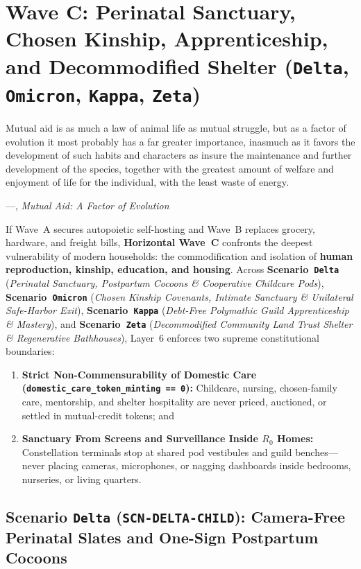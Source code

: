 \chapter{Wave C: Perinatal Sanctuary, Chosen Kinship, Apprenticeship, and Decommodified Shelter (\texttt{Delta}, \texttt{Omicron}, \texttt{Kappa}, \texttt{Zeta})}
\label{ch:wave-c}

\epigraph{Mutual aid is as much a law of animal life as mutual struggle, but as a factor of evolution it most probably has a far greater importance, inasmuch as it favors the development of such habits and characters as insure the maintenance and further development of the species, together with the greatest amount of welfare and enjoyment of life for the individual, with the least waste of energy.}{---\textcite{kropotkin1902}, \textit{Mutual Aid: A Factor of Evolution}}

If Wave~A secures autopoietic self-hosting and Wave~B replaces grocery, hardware, and freight bills, \textbf{Horizontal Wave~C} confronts the deepest vulnerability of modern households: the commodification and isolation of \textbf{human reproduction, kinship, education, and housing}. Across \textbf{Scenario~\texttt{Delta}} (\textit{Perinatal Sanctuary, Postpartum Cocoons \& Cooperative Childcare Pods}), \textbf{Scenario~\texttt{Omicron}} (\textit{Chosen Kinship Covenants, Intimate Sanctuary \& Unilateral Safe-Harbor Exit}), \textbf{Scenario~\texttt{Kappa}} (\textit{Debt-Free Polymathic Guild Apprenticeship \& Mastery}), and \textbf{Scenario~\texttt{Zeta}} (\textit{Decommodified Community Land Trust Shelter \& Regenerative Bathhouses}), Layer~6 enforces two supreme constitutional boundaries:
\begin{enumerate}
    \item \textbf{Strict Non-Commensurability of Domestic Care (\texttt{domestic\_care\_token\_minting == 0}):} Childcare, nursing, chosen-family care, mentorship, and shelter hospitality are never priced, auctioned, or settled in mutual-credit tokens; and
    \item \textbf{Sanctuary From Screens and Surveillance Inside $R_0$ Homes:} Constellation terminals stop at shared pod vestibules and guild benches---never placing cameras, microphones, or nagging dashboards inside bedrooms, nurseries, or living quarters.
\end{enumerate}

\section{Scenario \texttt{Delta} (\texttt{SCN-DELTA-CHILD}): Camera-Free Perinatal Slates and One-Sign Postpartum Cocoons}
\label{sec:wave-c-delta}


